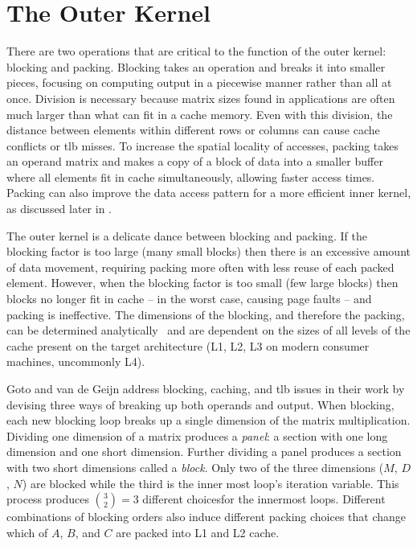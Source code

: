 \documentclass[\main/thesis.tex]{subfiles}
\begin{document}
\section{The Outer Kernel}
\label{sec:outerKernel}
There are two operations that are critical to the function of the outer kernel: blocking and packing.
Blocking takes an operation and breaks it into smaller pieces, focusing on computing output in a piecewise manner rather than all at once.
Division is necessary because matrix sizes found in applications are often much larger than what can fit in a cache memory.
Even with this division, the distance between elements within different rows or columns can cause cache conflicts or \gls{tlb} misses.
To increase the spatial locality of accesses, packing takes an operand matrix and makes a copy of a block of data into a smaller buffer where all elements fit in cache simultaneously, allowing faster access times.
Packing can also improve the data access pattern for a more efficient inner kernel, as discussed later in .

The outer kernel is a delicate dance between blocking and packing.
If the blocking factor is too large (\ie many small blocks) then there is an excessive amount of data movement, requiring packing more often with less reuse of each packed element.
However, when the blocking factor is too small (\ie few large blocks) then blocks no longer fit in cache -- in the worst case, causing page faults -- and packing is ineffective.
The dimensions of the blocking, and therefore the packing, can be determined analytically~\autocite{low2016analytical} and are dependent on the sizes of all levels of the cache present on the target architecture (L1, L2, L3 on modern consumer machines, uncommonly L4).

Goto and van de Geijn address blocking, caching, and \gls{tlb} issues in their work by devising three ways of breaking up both operands and output.
When blocking, each new blocking loop breaks up a single dimension of the matrix multiplication.
Dividing one dimension of a matrix produces a \emph{panel}: a section with one long dimension and one short dimension.
Further dividing a panel produces a section with two short dimensions called a \emph{block}.
Only two of the three dimensions ($M$, $D$, $N$) are blocked while the third is the inner most loop's iteration variable.
This process produces $\binom{3}{2}=3$ different choices\footnotemark for the innermost loops.
Different combinations of blocking orders also induce different packing choices that change which of $A$, $B$, and $C$ are packed into L1 and L2 cache.
\end{document}
